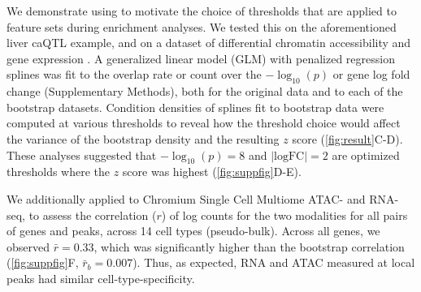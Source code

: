 We demonstrate using \bootranges to motivate the choice of thresholds 
that are applied to feature sets during enrichment analyses.
We tested this on the aforementioned liver caQTL example, and on a
dataset of differential chromatin accessibility and gene expression 
\citep{alasoo2018shared,lee2020fluent}.
A generalized linear model (GLM) with penalized regression splines was
fit to the overlap rate or count over the $-\log_{10}(p)$ or
gene log fold change (Supplementary Methods), both for the original
data and to each of the bootstrap datasets.
Condition densities of splines fit to bootstrap data
were computed at various thresholds to reveal how
the threshold choice would affect the
variance of the bootstrap density and the resulting $z$ score
(\cref{fig:result}C-D).
These analyses suggested that $-\log_{10}(p) = 8$ and
$|\textrm{logFC}| = 2$
are optimized thresholds where the $z$ score was highest
(\cref{fig:suppfig}D-E).

We additionally applied \bootranges to Chromium Single Cell Multiome
ATAC- and RNA-seq, to assess the correlation ($r$) of log counts for the two
modalities for all pairs of genes and peaks, across
14 cell types (pseudo-bulk). Across all genes, we observed
$\bar{r} = 0.33$, which was 
significantly higher than the bootstrap correlation
(\cref{fig:suppfig}F, $\bar{r}_{b} = 0.007$). Thus, as expected, RNA
and ATAC measured at local peaks had similar cell-type-specificity.

